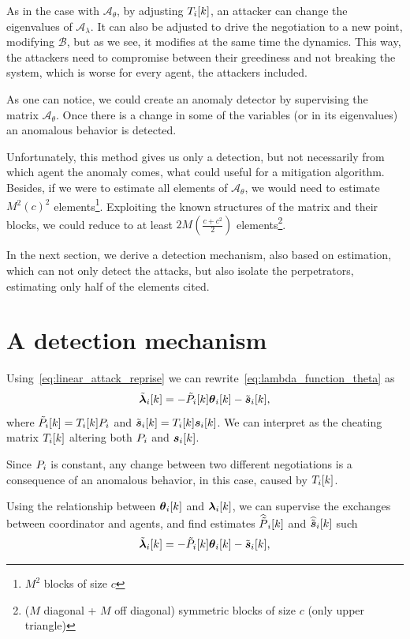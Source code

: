 \documentclass[../main.tex]{subfiles}
\begin{document}
As in the case with $\mathcal{A}_{\theta}$, by adjusting $T_{i}[k]$, an attacker can change the eigenvalues of $\mathcal{A}_{\lambda}$.
It can also be adjusted to drive the negotiation to a new point, modifying $\mathcal{B}$, but as we see, it modifies at the same time the dynamics.
This way, the attackers need to compromise between their greediness and not breaking the system, which is worse for every agent, the attackers included.

As one can notice, we could create an anomaly detector by supervising the matrix $\mathcal{A}_{\theta}$.
Once there is a change in some of the variables (or in its eigenvalues) an anomalous behavior is detected.

Unfortunately, this method gives us only a detection, but not necessarily from which agent the anomaly comes, what could useful for a mitigation algorithm.
Besides, if we were to estimate all elements of $\mathcal{A}_{\theta}$, we would need to estimate $M^{2}{(c)}^{2}$ elements\footnote{$M^{2}$ blocks of size ${c}$}.
Exploiting the known structures of the matrix and their blocks, we could reduce to at least $2M{(\frac{c+{c}^{2}}{2})}$ elements\footnote{($M$ diagonal + $M$ off diagonal) symmetric blocks of size ${c}$ (only upper triangle)}.

In the next section, we derive a detection mechanism, also based on estimation, which can not only detect the attacks, but also isolate the perpetrators, estimating only half of the elements cited.

\section{A detection mechanism}\label{sec:detection-mechanism}

Using~\eqref{eq:linear_attack_reprise} we can rewrite~\eqref{eq:lambda_function_theta} as
\begin{equation}
  \label{eq:lambda_function_theta_tilde}
\lambdaicheat[k]=-\Plintilde\thetaik-\tilde{\vec{s}}_{i}[k],
\end{equation}
where $\tilde{P}_{i}[k]=T_{i}[k]{P}_{i}$ and $\tilde{\boldsymbol{s}}_{i}[k]=T_{i}[k]\boldsymbol{s}_{i}[k]$.
We can interpret as the cheating matrix $T_{i}[k]$ altering both ${P}_{i}$ and $\boldsymbol{s}_{i}[k]$.

Since ${P}_{i}$ is constant, any change between two different negotiations is a consequence of an anomalous behavior, in this case, caused by $T_{i}[k]$.

Using the relationship between $\thetaik$ and $\lambdaik$, we can supervise the exchanges between coordinator and agents, and find estimates $\widehat{\tilde{P}}_{i}[k]$ and $\widehat{\tilde{\boldsymbol{s}}}_{i}[k]$ such
\begin{equation}
  \lambdaicheat[k]=-\Plintilde\thetaik-\tilde{\vec{s}}_{i}[k],
\end{equation}
\end{document}

